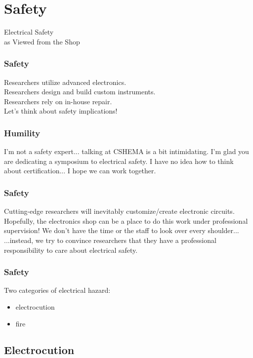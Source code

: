 \documentclass{presentation}
\begin{document}
\section{Safety}

\begin{frame}
  Electrical Safety \\
  as Viewed from the Shop
\end{frame}

\begin{frame}\frametitle{Safety}
  Researchers utilize advanced electronics. \\
  Researchers design and build custom instruments. \\
  Researchers rely on in-house repair. \\
  \vfill{}
  Let's think about safety implications!
\end{frame}

\begin{frame}\frametitle{Humility}
  I'm not a safety expert... talking at CSHEMA is a bit intimidating.
  \vfill
  I'm glad you are dedicating a symposium to electrical safety.
  \vfill
  I have no idea how to think about certification...
  \vfill
  I hope we can work together.
\end{frame}

\begin{frame}\frametitle{Safety}
  Cutting-edge researchers will inevitably customize/create electronic circuits.
  \vfill
  Hopefully, the electronics shop can be a place to do this work under professional supervision!
  \vfill
  We don't have the time or the staff to look over every shoulder...
  ...instead, we try to convince researchers that they have a professional responsibility to care about electrical safety.
\end{frame}

\begin{frame}\frametitle{Safety}
  Two categories of electrical hazard:
  \begin{itemize}
    \item electrocution
    \item fire
  \end{itemize}
\end{frame}

\subsection{Electrocution}
\end{document}
